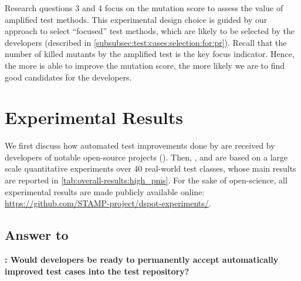 Research questions 3 and 4 focus on the mutation score to assess the value of amplified test methods. This experimental design choice is guided by our approach to select ``focused'' test methods, which are likely to be selected by the developers (described in \autoref{subsubsec:test:cases:selection:for:pr}). 
Recall that the number of killed mutants by the amplified test is the key focus indicator. Hence, the more \dspot is able to improve the mutation score, the more likely we are to find good candidates for the developers.%


\section{Experimental Results}
\label{sec:results}

We first discuss how automated test improvements done by \dspot are received by developers of notable open-source projects (\rqpullrequest{}).
Then, \rqcandidates{}, \rqeffectiveness{} and \rqAmplVersusIAmpl{} are based on a large scale quantitative experiments over 40 real-world test classes, whose main results are reported in \autoref{tab:overall-results:high_pms}. %
For the sake of open-science, all experimental results are made publicly available online:\\
\url{https://github.com/STAMP-project/dspot-experiments/}.




\subsection{Answer to \rqpullrequest}
\label{subsubsec:answer-rqpullrequest}

\textbf{\rqpullrequest: Would developers be ready to permanently accept automatically improved test cases into the test repository?}

